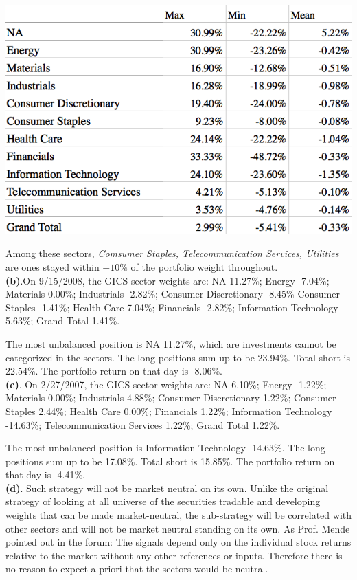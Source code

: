 \documentclass[11pt,letter]{article}
\begin{document}
\includegraphics[scale=0.4,keepaspectratio]{3a}

Among these sectors, \textit{Comsumer Staples, Telecommunication Services, Utilities} are ones stayed within $\pm 10\%$ of the portfolio weight throughout.\\

\textbf{(b)}.On 9/15/2008, the GICS sector weights are: 
NA	11.27\%; Energy	-7.04\%; Materials	0.00\%; Industrials	-2.82\%; Consumer Discretionary	-8.45\% Consumer Staples	-1.41\%; Health Care	7.04\%; Financials	-2.82\%; Information Technology	5.63\%; Grand Total	1.41\%.


The most unbalanced position is NA 11.27\%, which are investments cannot be categorized in the sectors. The long positions sum up to be 23.94\%. Total short is 22.54\%. The portfolio return on that day is -8.06\%.\\

\textbf{(c)}. On 2/27/2007, the GICS sector weights are:
NA	6.10\%; Energy	-1.22\%; Materials	0.00\%; Industrials	4.88\%; Consumer Discretionary	1.22\%; Consumer Staples	2.44\%; Health Care	0.00\%; Financials	1.22\%; Information Technology	-14.63\%; Telecommunication Services	1.22\%; Grand Total	1.22\%.


The most unbalanced position is Information Technology -14.63\%. The long positions sum up to be 17.08\%. Total short is 15.85\%. The portfolio return on that day is -4.41\%.\\


\textbf{(d)}. Such strategy will not be market neutral on its own. Unlike the original strategy of looking at all universe of the securities tradable and developing weights that can be made market-neutral, the sub-strategy will be correlated with other sectors and will not be market neutral standing on its own. As Prof. Mende pointed out in the forum: The signals depend only on the individual stock returns relative to the market without any other references or inputs. Therefore there is no reason to expect a priori that the sectors would be neutral.
\end{document}
